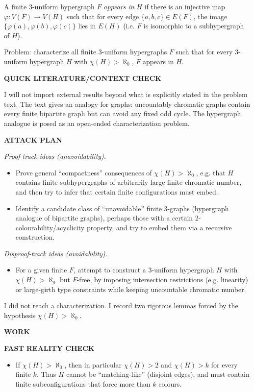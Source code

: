 A finite 3-uniform hypergraph $F$ \emph{appears in} $H$ if there is an injective map $\varphi:V(F)\to V(H)$ such that for every edge $\{a,b,c\}\in E(F)$, the image $\{\varphi(a),\varphi(b),\varphi(c)\}$ lies in $E(H)$ (i.e. $F$ is isomorphic to a subhypergraph of $H$).

Problem: characterize all finite 3-uniform hypergraphs $F$ such that for every 3-uniform hypergraph $H$ with $\chi(H)>\aleph_0$, $F$ appears in $H$.

\bigskip
\noindent\textbf{QUICK LITERATURE/CONTEXT CHECK}

I will not import external results beyond what is explicitly stated in the problem text.
The text gives an analogy for graphs: uncountably chromatic graphs contain every finite bipartite graph but can avoid any fixed odd cycle.
The hypergraph analogue is posed as an open-ended characterization problem.

\bigskip
\noindent\textbf{ATTACK PLAN}

\emph{Proof-track ideas (unavoidability).}
\begin{itemize}
\item Prove general ``compactness'' consequences of $\chi(H)>\aleph_0$, e.g. that $H$ contains finite subhypergraphs of arbitrarily large finite chromatic number, and then try to infer that certain finite configurations must embed.
\item Identify a candidate class of ``unavoidable'' finite 3-graphs (hypergraph analogue of bipartite graphs), perhaps those with a certain 2-colourability/acyclicity property, and try to embed them via a recursive construction.
\end{itemize}

\emph{Disproof-track ideas (avoidability).}
\begin{itemize}
\item For a given finite $F$, attempt to construct a 3-uniform hypergraph $H$ with $\chi(H)>\aleph_0$ but $F$-free, by imposing intersection restrictions (e.g. linearity) or large-girth type constraints while keeping uncountable chromatic number.
\end{itemize}

I did not reach a characterization. I record two rigorous lemmas forced by the hypothesis $\chi(H)>\aleph_0$.

\bigskip
\noindent\textbf{WORK}

\medskip
\noindent\textbf{FAST REALITY CHECK}

\begin{itemize}
\item If $\chi(H)>\aleph_0$, then in particular $\chi(H)>2$ and $\chi(H)>k$ for every finite $k$. Thus $H$ cannot be ``matching-like'' (disjoint edges), and must contain finite subconfigurations that force more than $k$ colours.
\end{itemize}

